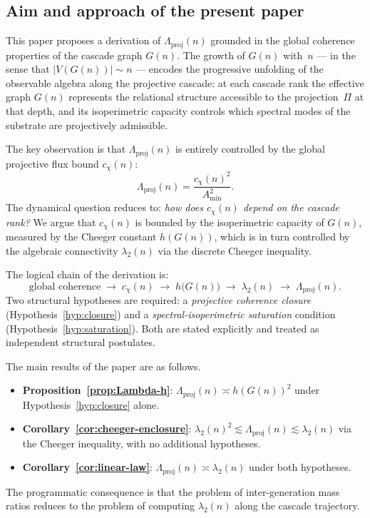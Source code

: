   \subsection{Aim and approach of the present paper}
    \label{sec:intro:aim}

    This paper proposes a derivation of $\Lambda_{\mathrm{proj}}(n)$ grounded in
    the global coherence properties of the cascade graph $G(n)$.
    The growth of $G(n)$ with~$n$ --- in the sense that $|V(G(n))| \sim n$ ---
    encodes the progressive unfolding of the observable algebra along the projective
    cascade: at each cascade rank the effective graph $G(n)$ represents the relational
    structure accessible to the projection~$\Pi$ at that depth, and its isoperimetric
    capacity controls which spectral modes of the substrate are projectively admissible.

    The key observation is that $\Lambda_{\mathrm{proj}}(n)$ is entirely controlled
    by the global projective flux bound $c_\chi(n)$:
    \[
      \Lambda_{\mathrm{proj}}(n) = \frac{c_\chi(n)^2}{A_{\min}^2}.
    \]
    The dynamical question reduces to: \emph{how does $c_\chi(n)$ depend on the
cascade rank?}
    We argue that $c_\chi(n)$ is bounded by the isoperimetric capacity of $G(n)$,
    measured by the Cheeger constant $h(G(n))$, which is in turn controlled by the
    algebraic connectivity $\lambda_2(n)$ via the discrete Cheeger inequality.

    The logical chain of the derivation is:
    \[
      \text{global coherence}
      \;\longrightarrow\; c_\chi(n)
      \;\longrightarrow\; h\bigl(G(n)\bigr)
      \;\longrightarrow\; \lambda_2(n)
      \;\longrightarrow\; \Lambda_{\mathrm{proj}}(n).
    \]
    Two structural hypotheses are required: a \emph{projective coherence closure}
    (Hypothesis~\ref{hyp:closure}) and a \emph{spectral-isoperimetric saturation}
    condition (Hypothesis~\ref{hyp:saturation}).
    Both are stated explicitly and treated as independent structural postulates.

    The main results of the paper are as follows.
    \begin{itemize}
      \item \textbf{Proposition~\ref{prop:Lambda-h}}:
      $\Lambda_{\mathrm{proj}}(n) \asymp h(G(n))^2$ under Hypothesis~\ref{hyp:closure}
      alone.
      \item \textbf{Corollary~\ref{cor:cheeger-enclosure}}:
      $\lambda_2(n)^2 \lesssim \Lambda_{\mathrm{proj}}(n) \lesssim \lambda_2(n)$
      via the Cheeger inequality, with no additional hypotheses.
      \item \textbf{Corollary~\ref{cor:linear-law}}:
      $\Lambda_{\mathrm{proj}}(n) \asymp \lambda_2(n)$ under both hypotheses.
    \end{itemize}
    The programmatic consequence is that the problem of inter-generation mass ratios
    reduces to the problem of computing $\lambda_2(n)$ along the cascade trajectory.

